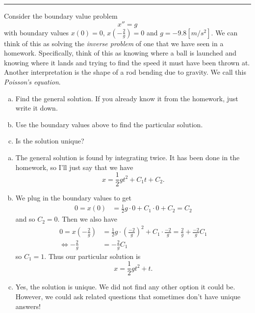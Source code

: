 \documentclass[12pt]{article} %
\begin{document}
\hrule
\begin{problem}
Consider the boundary value problem
\[
x''=g
\]
with boundary values $x(0)=0$, $x\left(-\frac{2}{g}\right)=0$ and $g=-9.8[m/s^2]$.  We can think of this as solving the \emph{inverse problem} of one that we have seen in a homework. Specifically, think of this as knowing where a ball is launched and knowing where it lands and trying to find the speed it must have been thrown at.  Another interpretation is the shape of a rod bending due to gravity. We call this \emph{Poisson's equation}.
\begin{enumerate}[(a)]
    \item Find the general solution. If you already know it from the homework, just write it down.
    \item Use the boundary values above to find the particular solution.
    \item Is the solution unique? 
\end{enumerate}
\end{problem}
\begin{solution}
\begin{enumerate}[(a)]
    \item The general solution is found by integrating twice.  It has been done in the homework, so I'll just say that we have
    \[
    x=\frac{1}{2}gt^2+C_1t+C_2.
    \]
    \item We plug in the boundary values to get
    \begin{align*}
        0=x(0)&=\frac{1}{2}g\cdot 0 + C_1 \cdot 0 + C_2 = C_2
    \end{align*}
    and so $C_2=0$. Then we also have
    \begin{align*}
        0=x\left(-\frac{2}{g}\right)&= \frac{1}{2}g\cdot \left(\frac{-2}{g}\right)^2+C_1 \cdot \frac{-2}{g}= \frac{2}{g}+\frac{-2}{g}C_1\\
        \iff -\frac{2}{g}&=-\frac{2}{g}C_1
    \end{align*}
    so $C_1=1$. Thus our particular solution is
    \[
    x=\frac{1}{2}gt^2 + t.
    \]
    \item Yes, the solution is unique.  We did not find any other option it could be.  However, we could ask related questions that sometimes don't have unique answers!
\end{enumerate}
\end{solution}
\end{document}
